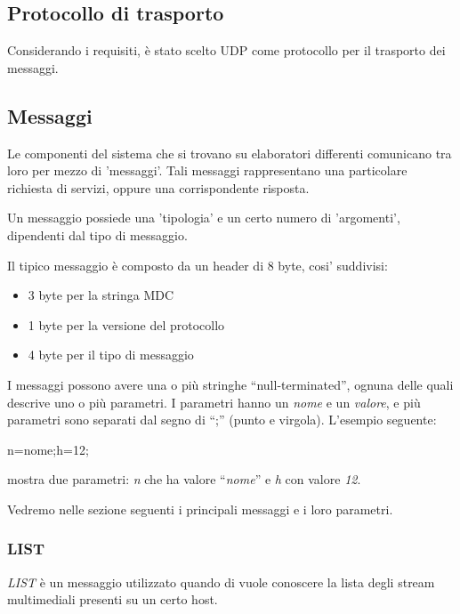 \subsection{Protocollo di trasporto}
Considerando i requisiti, è stato scelto UDP come protocollo per il trasporto
dei messaggi.

\subsection{Messaggi}


Le componenti del sistema che si trovano su elaboratori differenti comunicano tra
loro per mezzo di 'messaggi'. Tali messaggi rappresentano una particolare
richiesta di servizi, oppure una corrispondente risposta.

Un messaggio possiede una 'tipologia' e un certo numero di 'argomenti', dipendenti dal tipo di messaggio.

Il tipico messaggio è composto da un header di 8 byte, cosi' suddivisi:



\begin{itemize}
\item 3 byte per la stringa MDC

\item 1 byte per la versione del protocollo

\item 4 byte per il tipo di messaggio
\end{itemize}

I messaggi possono avere una o più stringhe ``null-terminated'',
ognuna delle quali descrive uno o più parametri. I parametri hanno un
\emph{nome} e un \emph{valore}, e più parametri sono separati dal segno di
``;'' (punto e virgola). L'esempio seguente:

\begin{code}
n=nome;h=12;
\end{code}

mostra due parametri: \emph{n} che ha valore ``\emph{nome}'' e \emph{h} con
valore \emph{12}.

Vedremo nelle sezione seguenti i principali messaggi e i loro parametri.




\subsubsection*{LIST}
%
\emph{LIST} è un messaggio utilizzato quando di vuole conoscere la lista degli
stream multimediali presenti su un certo host.

